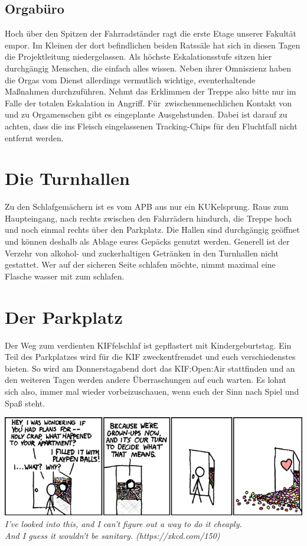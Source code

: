 \subsection*{Orgabüro}
Hoch über den Spitzen der Fahrradständer ragt die erste Etage unserer Fakultät empor.
Im Kleinen der dort befindlichen beiden Ratssäle hat sich in diesen Tagen die Projektleitung niedergelassen.
Als höchste Eskalationsstufe sitzen hier durchgängig Menschen, die einfach alles wissen.
Neben ihrer Omniszienz haben die Orgas vom Dienst allerdings vermutlich wichtige, eventerhaltende Maßnahmen durchzuführen.
Nehmt das Erklimmen der Treppe also bitte nur im Falle der totalen Eskalation in Angriff.
Für~zwischenmenschlichen Kontakt von und zu Orgamenschen gibt es eingeplante Ausgehstunden.
Dabei ist darauf zu achten, dass die ins Fleisch eingelassenen Tracking-Chips für den Fluchtfall nicht entfernt werden.

\section*{Die Turnhallen}
Zu den Schlafgemächern ist es vom APB aus nur ein KUKelsprung.
Raus zum Haupteingang, nach rechts zwischen den Fahrrädern hindurch, die Treppe hoch und noch einmal rechts über den Parkplatz.
Die Hallen sind durchgängig geöffnet und können deshalb als Ablage eures Gepäcks genutzt werden.
Generell ist der Verzehr von alkohol- und zuckerhaltigen Getränken in den Turnhallen nicht gestattet.
Wer auf der sicheren Seite schlafen möchte, nimmt maximal eine Flasche wasser mit zum schlafen.

\section*{Der Parkplatz}
Der Weg zum verdienten KIFfelschlaf ist gepflastert mit Kindergeburtstag.
Ein Teil des Parkplatzes wird für die KIF zweckentfremdet und euch verschiedenstes bieten.
So wird am Donnerstagabend dort das KIF:Open:Air stattfinden und an den weiteren Tagen werden andere Überraschungen auf euch warten.
Es lohnt sich also, immer mal wieder vorbeizuschauen, wenn euch der Sinn nach Spiel und Spaß steht.

\vfill

\begin{center}
\includegraphics[width=.8\textwidth,keepaspectratio]{img/xkcd/grownups.png}\\
{\footnotesize \textit{I've looked into this, and I can't figure out a way to do it cheaply.\\And I guess it wouldn't be sanitary. (https://xkcd.com/150)}}
\end{center}

